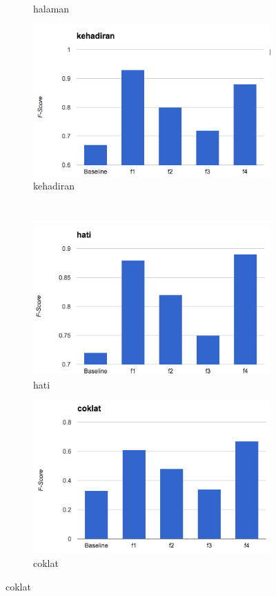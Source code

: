 \begin{figure}[H]
\begin{subfigure}{.5\textwidth}
		\caption{halaman}
	\end{subfigure}%
	\begin{subfigure}{.5\textwidth}
		\centering
		\includegraphics[width=1\linewidth]{adit_pics/kehadiran.png}
		\caption{kehadiran}
	\end{subfigure}%
	\\
	\begin{subfigure}{.5\textwidth}
		\centering
		\includegraphics[width=1\linewidth]{adit_pics/hati.png}
		\caption{hati}
	\end{subfigure}%
	\begin{subfigure}{.5\textwidth}
		\centering
		\includegraphics[width=1\linewidth]{adit_pics/coklat.png}
		\caption{coklat}
	\end{subfigure}%
\end{figure}
